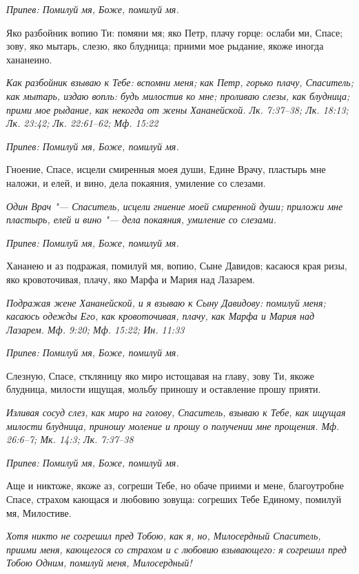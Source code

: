 \itshape Припев:\normalfont{} Помилуй мя, Боже, помилуй мя.


Яко разбойник вопию Ти: помяни мя; яко Петр, плачу горце: ослаби ми, Спасе; зову, яко мытарь, слезю, яко блудница; приими мое рыдание, якоже иногда хананеино.


\itshape Как разбойник взываю к Тебе: вспомни меня; как Петр, горько плачу, Спаситель; как мытарь, издаю вопль: будь милостив ко мне; проливаю слезы, как блудница; прими мое рыдание, как некогда от жены Хананейской. Лк. 7:37–38; Лк. 18:13; Лк. 23:42; Лк. 22:61–62; Мф. 15:22\normalfont{}


\itshape Припев:\normalfont{} Помилуй мя, Боже, помилуй мя.


Гноение, Спасе, исцели смиренныя моея души, Едине Врачу, пластырь мне наложи, и елей, и вино, дела покаяния, умиление со слезами.


\itshape Один Врач "--- Спаситель, исцели гниение моей смиренной души; приложи мне пластырь, елей и вино "--- дела покаяния, умиление со слезами.\normalfont{}


\itshape Припев:\normalfont{} Помилуй мя, Боже, помилуй мя.


Хананею и аз подражая, помилуй мя, вопию, Сыне Давидов; касаюся края ризы, яко кровоточивая, плачу, яко Марфа и Мария над Лазарем.


\itshape Подражая жене Хананейской, и я взываю к Сыну Давидову: помилуй меня; касаюсь одежды Его, как кровоточивая, плачу, как Марфа и Мария над Лазарем. Мф. 9:20; Мф. 15:22; Ин. 11:33\normalfont{}


\itshape Припев:\normalfont{} Помилуй мя, Боже, помилуй мя.


Слезную, Спасе, сткляницу яко миро истощавая на главу, зову Ти, якоже блудница, милости ищущая, мольбу приношу и оставление прошу прияти.


\itshape Изливая сосуд слез, как миро на голову, Спаситель, взываю к Тебе, как ищущая милости блудница, приношу моление и прошу о получении мне прощения. Мф. 26:6–7; Мк. 14:3; Лк. 7:37–38\normalfont{}


\itshape Припев:\normalfont{} Помилуй мя, Боже, помилуй мя.


Аще и никтоже, якоже аз, согреши Тебе, но обаче приими и мене, благоутробне Спасе, страхом кающася и любовию зовуща: согреших Тебе Единому, помилуй мя, Милостиве.


\itshape Хотя никто не согрешил пред Тобою, как я, но, Милосердный Спаситель, приими меня, кающегося со страхом и с любовию взывающего: я согрешил пред Тобою Одним, помилуй меня, Милосердный!\normalfont{}



